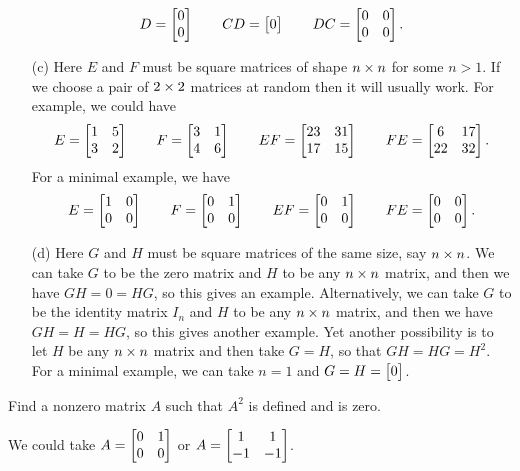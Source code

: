 \documentclass[a4paper]{amsart}
\renewenvironment{solution}{\SolutionInline}{\endSolutionInline}
\begin{document}
\begin{solution}
\begin{itemize}
\[      D = \left[\begin{matrix} 0 \\ 0 \end{matrix}\right] \qquad
      CD = \left[\begin{matrix} 0 \end{matrix}\right] \qquad
      DC = \left[\begin{matrix} 0 & 0 \\ 0 & 0 \end{matrix}\right].
   \]
  \item[(c)] Here $E$ and $F$ must be square matrices of shape
   $n\times n$ for some $n>1$.  If we choose a pair of $2\times 2$ matrices
   at random then it will usually work.  For example, we could have 
   \[ E = \left[\begin{matrix} 1&5\\3&2 \end{matrix}\right] \qquad
      F = \left[\begin{matrix} 3&1\\4&6 \end{matrix}\right] \qquad
      EF = \left[\begin{matrix} 23 & 31 \\ 17 & 15 \end{matrix}\right] \qquad
      FE = \left[\begin{matrix} 6 & 17 \\ 22 & 32 \end{matrix}\right].
   \]
   For a minimal example, we have
   \[ E  = \left[\begin{matrix} 1&0\\0&0 \end{matrix}\right] \qquad
      F  = \left[\begin{matrix} 0&1\\0&0 \end{matrix}\right] \qquad
      EF = \left[\begin{matrix} 0&1\\0&0 \end{matrix}\right] \qquad
      FE = \left[\begin{matrix} 0&0\\0&0 \end{matrix}\right].
   \]
  \item[(d)] Here $G$ and $H$ must be square matrices of the same
   size, say $n\times n$.  We can take $G$ to be the zero matrix and $H$
   to be any $n\times n$ matrix, and then we have $GH=0=HG$, so this
   gives an example.  Alternatively, we can take $G$ to be the
   identity matrix $I_n$ and $H$ to be any $n\times n$ matrix, and then
   we have $GH=H=HG$, so this gives another example.  Yet another
   possibility is to let $H$ be any $n\times n$ matrix and then take
   $G=H$, so that $GH=HG=H^2$.  For a minimal example, we can take
   $n=1$ and $G=H=\left[\begin{matrix} 0 \end{matrix}\right]$.
 \end{itemize}
\end{solution}

\begin{exercise}\label{ex-mat-prod-eg-ii}
 Find a nonzero matrix $A$ such that $A^2$ is defined and is zero.
\end{exercise}
\begin{solution}
 We could take $A=\left[\begin{matrix} 0&1\\0&0\end{matrix}\right]$ or $A=\left[\begin{matrix} 1&1\\-1&-1\end{matrix}\right]$.
\end{solution}
\end{document}
